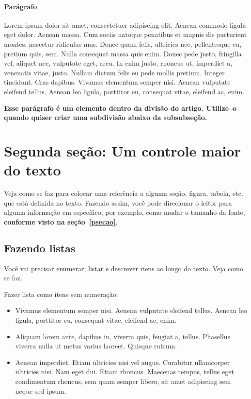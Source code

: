 \documentclass[pdftex,12pt,a4paper]{article} %
\begin{document}
\paragraph{Parágrafo}

Lorem ipsum dolor sit amet, consectetuer adipiscing elit. Aenean
commodo ligula eget dolor. Aenean massa. Cum sociis natoque penatibus
et magnis dis parturient montes, nascetur ridiculus mus. Donec quam
felis, ultricies nec, pellentesque eu, pretium quis, sem. Nulla
consequat massa quis enim. Donec pede justo, fringilla vel, aliquet
nec, vulputate eget, arcu. In enim justo, rhoncus ut, imperdiet a,
venenatis vitae, justo. Nullam dictum felis eu pede mollis
pretium. Integer tincidunt. Cras dapibus. Vivamus elementum semper
nisi. Aenean vulputate eleifend tellus. Aenean leo ligula, porttitor
eu, consequat vitae, eleifend ac, enim.

{\bf Esse parágrafo é um elemento dentro da divisão do
  artigo. Utilize--o quando quiser criar uma subdivisão abaixo da
  subsubseção.}

\section{Segunda seção: Um controle maior do texto}

Veja como se faz para colocar uma referência a alguma seção, figura,
tabela, etc. que está definida no texto. Fazendo assim, você pode
direcionar o leitor para alguma informação em específico, por exemplo,
como mudar o tamanho da fonte, {\bf conforme visto na
  seção~\ref{psecao}}.

\subsection{Fazendo listas}

Você vai precisar enumerar, listar e descrever itens ao longo do
texto. Veja como se faz.

Fazer lista como itens sem numeração:
\begin{itemize}
  \item Vivamus elementum semper nisi. Aenean vulputate eleifend
tellus. Aenean leo ligula, porttitor eu, consequat vitae, eleifend ac,
enim.
\item Aliquam lorem ante, dapibus in, viverra quis, feugiat a,
tellus. Phasellus viverra nulla ut metus varius laoreet. Quisque
rutrum.
\item Aenean imperdiet. Etiam ultricies nisi vel augue. Curabitur
ullamcorper ultricies nisi. Nam eget dui. Etiam rhoncus. Maecenas
tempus, tellus eget condimentum rhoncus, sem quam semper libero, sit
amet adipiscing sem neque sed ipsum.
\end{itemize}
\end{document}
